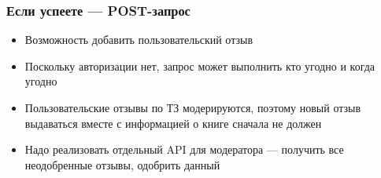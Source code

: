 \documentclass{../mcsslides}
\begin{document}
    \begin{frame}
        \frametitle{Если успеете --- POST-запрос}
        \begin{itemize}
            \item Возможность добавить пользовательский отзыв
            \item Поскольку авторизации нет, запрос может выполнить кто угодно и когда угодно
            \item Пользовательские отзывы по ТЗ модерируются, поэтому новый отзыв выдаваться вместе с информацией о книге сначала не должен
            \item Надо реализовать отдельный API для модератора --- получить все неодобренные отзывы, одобрить данный
        \end{itemize}
    \end{frame}
\end{document}
